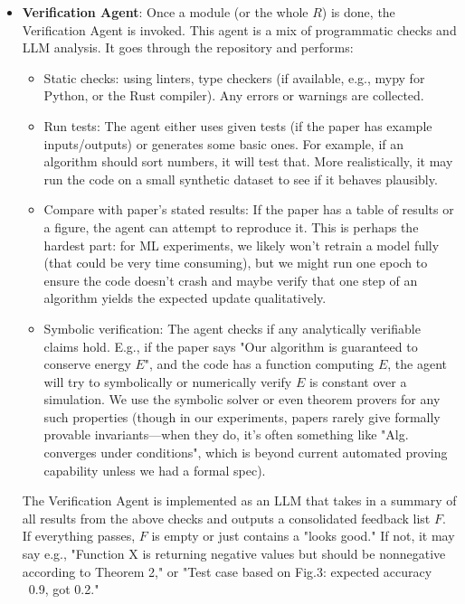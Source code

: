 \documentclass{ieeeaccess}
\begin{document}
\begin{itemize}
There can be multiple Code Agents each getting a part of the plan. We manage dependencies by ordering: if module A uses module B, the Coordinator might ensure B is implemented first or provide a stub of B to A. In practice, if the plan is well-ordered topologically, we follow that.

We also allow the Code Agent to query external libraries (dashed line to "Domain Libraries" in Fig. \ref{fig:end-to-end}). Concretely, if the code needs to use a specific API (say TensorFlow), the Code Agent might not recall the exact import or usage. We integrate an API auto-complete feature: the agent can produce a placeholder, then the Coordinator queries a documentation or code example database to fill it. In our implementation, we fine-tuned the model or use a plugin that can fetch documentation for an identifier.

\item \textbf{Verification Agent}: Once a module (or the whole $R$) is done, the Verification Agent is invoked. This agent is a mix of programmatic checks and LLM analysis. It goes through the repository and performs:
\begin{itemize}
    \item Static checks: using linters, type checkers (if available, e.g., mypy for Python, or the Rust compiler). Any errors or warnings are collected.
    \item Run tests: The agent either uses given tests (if the paper has example inputs/outputs) or generates some basic ones. For example, if an algorithm should sort numbers, it will test that. More realistically, it may run the code on a small synthetic dataset to see if it behaves plausibly.
    \item Compare with paper's stated results: If the paper has a table of results or a figure, the agent can attempt to reproduce it. This is perhaps the hardest part: for ML experiments, we likely won't retrain a model fully (that could be very time consuming), but we might run one epoch to ensure the code doesn't crash and maybe verify that one step of an algorithm yields the expected update qualitatively.
    \item Symbolic verification: The agent checks if any analytically verifiable claims hold. E.g., if the paper says "Our algorithm is guaranteed to conserve energy $E$", and the code has a function computing $E$, the agent will try to symbolically or numerically verify $E$ is constant over a simulation. We use the symbolic solver or even theorem provers for any such properties (though in our experiments, papers rarely give formally provable invariants---when they do, it's often something like "Alg. converges under conditions", which is beyond current automated proving capability unless we had a formal spec).
\end{itemize}
The Verification Agent is implemented as an LLM that takes in a summary of all results from the above checks and outputs a consolidated feedback list $F$. If everything passes, $F$ is empty or just contains a "looks good." If not, it may say e.g., "Function X is returning negative values but should be nonnegative according to Theorem 2," or "Test case based on Fig.3: expected accuracy ~0.9, got 0.2."


\end{itemize}
\end{document}
